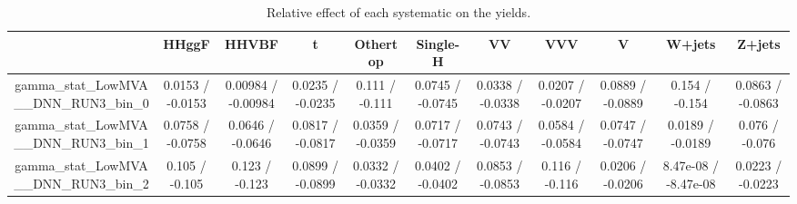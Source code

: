 \documentclass[10pt]{article}
\begin{document}
\begin{table}[htbp]
\begin{center}
\begin{tabular}{|c|c|c|c|c|c|c|c|c|c|c|}
\hline 
      & HHggF      & HHVBF      & t      & Othertop      & Single-H      & VV      & VVV      & V      & W+jets      & Z+jets \\ 
\hline 
  gamma_stat_LowMVA__DNN_RUN3_bin_0 & 0.0153 / -0.0153 & 0.00984 / -0.00984 & 0.0235 / -0.0235 & 0.111 / -0.111 & 0.0745 / -0.0745 & 0.0338 / -0.0338 & 0.0207 / -0.0207 & 0.0889 / -0.0889 & 0.154 / -0.154 & 0.0863 / -0.0863 \\ 
  gamma_stat_LowMVA__DNN_RUN3_bin_1 & 0.0758 / -0.0758 & 0.0646 / -0.0646 & 0.0817 / -0.0817 & 0.0359 / -0.0359 & 0.0717 / -0.0717 & 0.0743 / -0.0743 & 0.0584 / -0.0584 & 0.0747 / -0.0747 & 0.0189 / -0.0189 & 0.076 / -0.076 \\ 
  gamma_stat_LowMVA__DNN_RUN3_bin_2 & 0.105 / -0.105 & 0.123 / -0.123 & 0.0899 / -0.0899 & 0.0332 / -0.0332 & 0.0402 / -0.0402 & 0.0853 / -0.0853 & 0.116 / -0.116 & 0.0206 / -0.0206 & 8.47e-08 / -8.47e-08 & 0.0223 / -0.0223 \\ 
\hline 
\end{tabular} 
\caption{Relative effect of each systematic on the yields.} 
\end{center} 
\end{table} 
\end{document}
